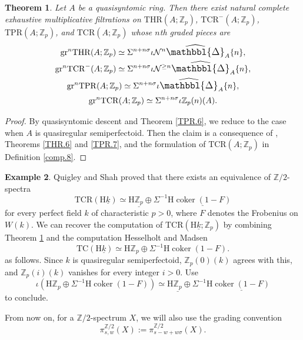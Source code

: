 \documentclass[10pt]{amsart}
\newtheorem{thm}{Theorem}[section]
\theoremstyle{definition}
\newtheorem{exm}[thm]{Example}
\numberwithin{equation}{section}
\newcommand{\Z}{\mathbb{Z}}
\newcommand{\cN}{\mathcal{N}}
\newcommand{\rH}{\mathrm{H}}
\newcommand{\ul}{\underline}
\newcommand{\prism}{{\mathlarger{\mathbbl{\Delta}}}}
\DeclareMathOperator{\coker}{coker}
\newcommand{\gr}{\mathrm{gr}}
\newcommand{\TPR}{\mathrm{TPR}}
\newcommand{\THR}{\mathrm{THR}}
\newcommand{\TC}{\mathrm{TC}}
\newcommand{\TCR}{\mathrm{TCR}}
\begin{document}
{\begin{thm}
\label{TCR.1}
Let $A$ be a quasisyntomic ring.
Then there exist natural complete exhaustive multiplicative filtrations on $\THR(A;\Z_p)$, $\TCR^-(A;\Z_p)$, $\TPR(A;\Z_p)$, and $\TCR(A;\Z_p)$ whose $n$th graded pieces are
\begin{gather*}
\gr^n \THR(A;\Z_p)
\simeq
\Sigma^{n+n\sigma}
\iota \cN^n  \widehat{\prism}_A\{n\},
\\
\gr^n \TCR^-(A;\Z_p)
\simeq
\Sigma^{n+n\sigma}
\iota \cN^{\geq n} \widehat{\prism}_A\{n\},
\\
\gr^n \TPR(A;\Z_p)
\simeq
\Sigma^{n+n\sigma}
\iota \widehat{\prism}_A\{n\},
\\
\gr^n \TCR(A;\Z_p)
\simeq
\Sigma^{n+n\sigma}
\iota \Z_p(n)(A).
\end{gather*}
\end{thm}
\begin{proof}
By quasisyntomic descent \cite[Proposition 4.31]{BMS19} and Theorem \ref{TPR.6},
we reduce to the case when $A$ is quasiregular semiperfectoid.
Then the claim is a consequence of \cite[Theorem 1.12]{BMS19},
Theorems \ref{THR.6} and \ref{TPR.7},
and the formulation of $\TCR(A;\Z_p)$ in Definition \ref{comp.8}.
\end{proof}


\begin{exm}
\label{TCR.5}
Quigley and Shah \cite[Theorem 6.30]{QS22} proved that there exists an equivalence of $\Z/2$-spectra
\[
\TCR(\rH \ul{k})
\simeq
\rH \ul{\Z_p} \oplus \Sigma^{-1} \rH \ul{\coker(1-F)}
\]
for every perfect field $k$ of characteristic $p>0$,
where $F$ denotes the Frobenius on $W(k)$.
We can recover the computation of $\TCR(\rH\ul{k};\Z_p)$ by combining Theorem \ref{TCR.1} and the computation Hesselholt and Madsen \cite[Theorem B]{MR1410465}
\[
\TC(\rH \ul{k})
\simeq
\rH \Z_p \oplus \Sigma^{-1} \rH \coker(1-F).
\]
as follows.
Since $k$ is quasiregular semiperfectoid,
$\Z_p(0)(k)$ agrees with this, and $\Z_p(i)(k)$ vanishes for every integer $i>0$.
Use
\[
\iota (\rH \Z_p \oplus \Sigma^{-1} \rH \coker(1-F))
\simeq
\rH \ul{\Z_p} \oplus \Sigma^{-1} \rH \ul{\coker(1-F)}
\]
to conclude.
\end{exm}



From now on,
for a $\Z/2$-spectrum $X$,
we will also use the grading convention
\[
\pi_{s,w}^{\Z/2}(X)
:=
\pi_{s-w+w\sigma}^{\Z/2}(X).
\]





}
\end{document}
